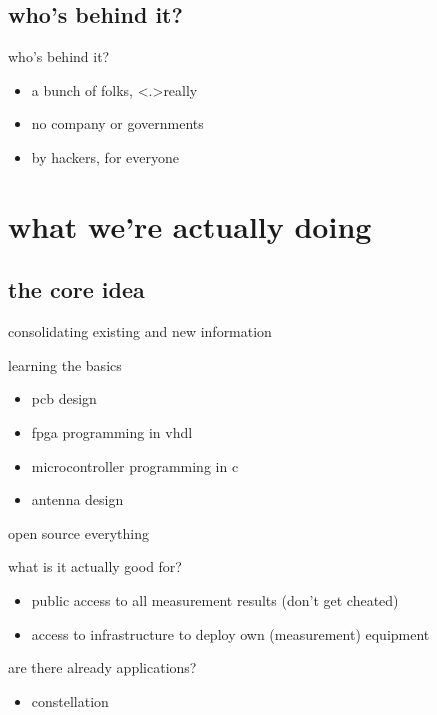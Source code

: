\subsection{who's behind it?}
	\begin{frame}{who's behind it?}
		\begin{itemize}
			\item a bunch of folks, \alert<.>{really}
			\item no company or governments
			\item by hackers, for everyone
		\end{itemize}
	\end{frame}


\section{what we're actually doing}

\subsection{the core idea}
	\begin{frame}{consolidating existing and new information}
	\end{frame}
	\begin{frame}{learning the basics}
		\begin{itemize}
			\item pcb design
			\item fpga programming in vhdl
			\item microcontroller programming in c
			\item antenna design
		\end{itemize}
	\end{frame}
	\begin{frame}{open source everything}
	\end{frame}
	\begin{frame}{what is it actually good for?}
		\begin{itemize}
			\item public access to all measurement results (don't get cheated)
			\item access to infrastructure to deploy own (measurement) equipment
		\end{itemize}
	\end{frame}
	\begin{frame}{are there already applications?}
		\begin{itemize}
			\item constellation
		\end{itemize}
	\end{frame}

